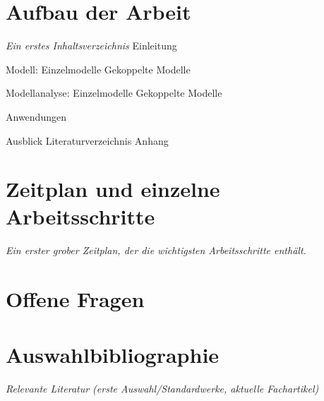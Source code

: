 \documentclass[11pt, titlepage=true]{scrartcl} %
\newcommand{\was}[1]{\small\textit{#1}}
\begin{document}
\section{Aufbau der Arbeit}
\was{Ein erstes Inhaltsverzeichnis}
Einleitung

Modell:
Einzelmodelle
Gekoppelte Modelle

Modellanalyse:
Einzelmodelle
Gekoppelte Modelle

Anwendungen

Ausblick
Literaturverzeichnis
Anhang

\section{Zeitplan und einzelne Arbeitsschritte}
\was{Ein erster grober Zeitplan, der die wichtigsten Arbeitsschritte enthält.}

\section{Offene Fragen}

\section{Auswahlbibliographie}
\was{Relevante Literatur (erste Auswahl/Standardwerke, aktuelle Fachartikel)}

\end{document}
